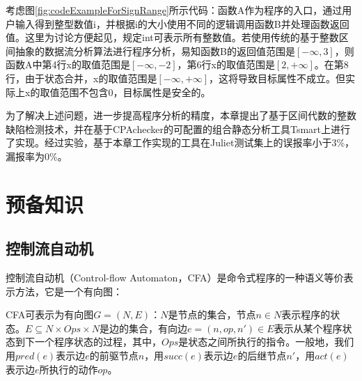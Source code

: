 考虑图\ref{fig:codeExampleForSignRange}所示代码：函数A作为程序的入口，通过用户输入得到整型数值i，并根据i的大小使用不同的逻辑调用函数B并处理函数返回值。这里为讨论方便起见，规定int可表示所有整数值。若使用传统的基于整数区间抽象的数据流分析算法进行程序分析，易知函数B的返回值范围是$ [-\infty, 3] $，则函数A中第4行x的取值范围是$ [-\infty, -2] $，第6行x的取值范围是$ [2, +\infty] $。在第8行，由于状态合并，x的取值范围是$ [-\infty, +\infty] $，这将导致目标属性不成立。但实际上x的取值范围不包含0，目标属性是安全的。

为了解决上述问题，进一步提高程序分析的精度，本章提出了基于区间代数的整数缺陷检测技术，并在基于CPAchecker\cite{beyer2007configurable}的可配置的组合静态分析工具Tsmart上进行了实现。经过实验，基于本章工作实现的工具在Juliet测试集上的误报率小于3\%，漏报率为0\%。

\section{预备知识}
\label{sec:区间算数预备知识}

%

\subsection{控制流自动机}
\label{sec:控制流自动机}

控制流自动机（Control-flow Automaton，CFA）是命令式程序的一种语义等价表示方法，它是一个有向图：
\begin{definition}
	CFA可表示为有向图$ G = (N, E) $：$ N $是节点的集合，节点$ n \in N $表示程序的状态。$ E \subseteq N \times Ops \times N $是边的集合，有向边$ e = (n, op, n') \in E $表示从某个程序状态到下一个程序状态的过程，其中，$ Ops $是状态之间所执行的指令。一般地，我们用$ pred(e) $表示边$ e $的前驱节点$ n $，用$ succ(e) $表示边$ e $的后继节点$ n' $，用$ act(e) $表示边$ e $所执行的动作$ op $。
\end{definition}

